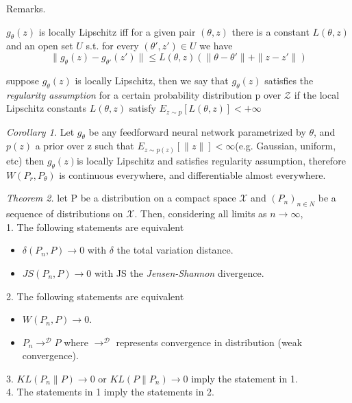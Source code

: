 \documentclass[english]{article}
\begin{document}
\item {Remarks}.

\benum 
\item   $g_\theta(z)$ is locally Lipschitz iff for a given pair $(\theta, z)$ there is a constant $L(\theta, z)$ and an open set $U$ s.t. for every $(\theta', z')\in U$ we have $$\|g_{\theta} (z)-g_{\theta'}(z')\| \le L(\theta, z)(\|\theta-\theta'\|+\|z-z'\|) $$
\item   suppose $g_\theta(z)$ is locally Lipschitz, then we say that $g_\theta(z)$ satisfies the \emph{regularity assumption} for a certain probability distribution p over $\mathcal{Z}$ if the local Lipschitz constants $L(\theta, z)$ satisfy $E_{z\sim p} [L(\theta, z)]< +\infty$
\eenum





\item {\emph{Corollary 1.}}
 Let $g_\theta$ be any feedforward neural network parametrized by $\theta$, and $p(z)$ a prior over z such that $E_{z\sim p(z)}[\|z\|]<\infty$(e.g. Gaussian, uniform, etc) then $g_\theta(z)$is locally Lipschitz and satisfies regularity assumption, therefore $W(P_r,P_\theta)$ is continuous everywhere, and differentiable almost everywhere.
 





\item {\emph{Theorem 2.}}
 let P be a distribution on a compact space $\mathcal{X}$ and $(P_n)_{n\in N}$ be a sequence of distributions on $\mathcal{X}$. Then, considering all limits as $n \rightarrow \infty$, \\
 1. The following statements are equivalent 
 \begin{itemize}
  \item $\delta(P_n, P)\rightarrow 0$ with $\delta$ the total variation distance.
  \item $JS(P_n, P)\rightarrow 0$ with JS the \emph{Jensen-Shannon} divergence.
  \end{itemize}

 2. The following statements are equivalent
 \begin{itemize}
  \item $W(P_n, P)\rightarrow 0$.
  \item $P_n \rightarrow^{\mathcal{D}} P$ where $\rightarrow^{\mathcal{D}}$ represents convergence in distribution (weak convergence).
  \end{itemize}


3. $KL(P_n\|P)\rightarrow 0$ or $KL(P\|P_n)\rightarrow 0$ imply the statement in 1.\\
4. The statements in 1 imply the statements in 2.
\end{document}
